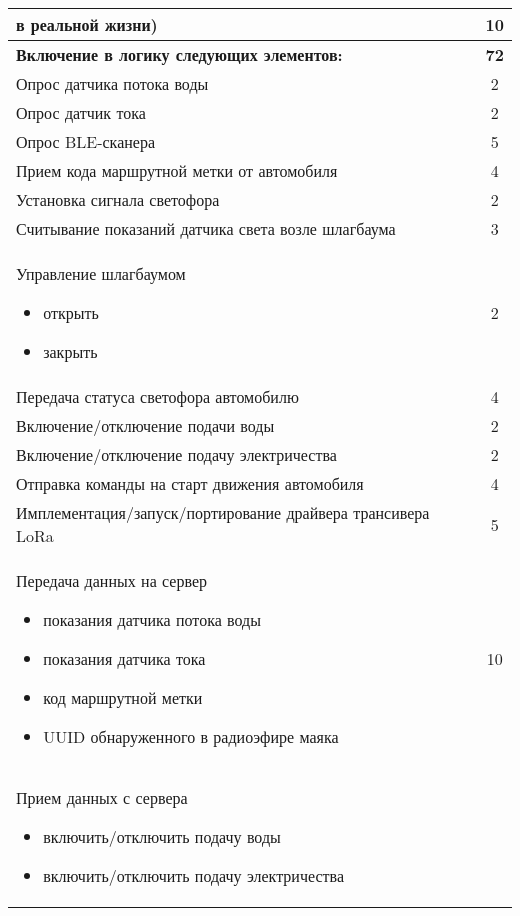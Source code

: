 \begin{table}[H]
\begin{tabular}{|p{14cm}|c|}
        в реальной жизни) & 10 \\
        \hline
        \hline
        \textbf{Включение в логику следующих элементов:} & \textbf{72}  \\
        \hline
        Опрос датчика потока воды & 2 \\
        \hline
        Опрос датчик тока & 2 \\
        \hline
        Опрос BLE-сканера & 5 \\
        \hline
        Прием кода маршрутной метки от автомобиля & 4 \\
        \hline
        Установка сигнала светофора & 2 \\
        \hline
        Считывание показаний датчика света возле шлагбаума & 3 \\
        \hline
        Управление шлагбаумом 
        \begin{itemize}
            \item открыть            
            \item закрыть
        \end{itemize} & 2 \\
        \hline
        Передача статуса светофора автомобилю & 4 \\
        \hline
        Включение/отключение подачи воды & 2 \\
        \hline
        Включение/отключение подачу электричества & 2 \\
        \hline
        Отправка команды на старт движения автомобиля & 4 \\
        \hline
        Имплементация/запуск/портирование драйвера трансивера LoRa & 5 \\
        \hline
        Передача данных на сервер
        \begin{itemize}
            \item показания датчика потока воды 
            \item показания датчика тока 
            \item код маршрутной метки 
            \item UUID обнаруженного в радиоэфире маяка                 
        \end{itemize} & 10 \\
        \hline
        Прием данных с сервера
        \begin{itemize}
            \item включить/отключить подачу воды
            \item включить/отключить подачу электричества

\end{itemize}
\end{tabular}
\end{table}
